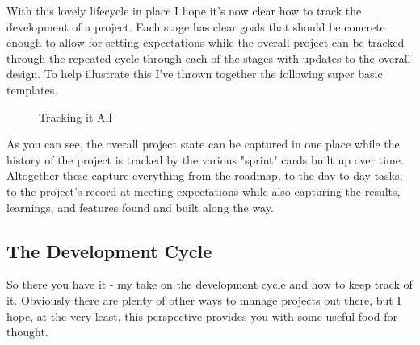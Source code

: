 \documentclass[10pt,a5paper]{book}
\begin{document}
With this lovely lifecycle in place I hope it's now clear how to track the development of a project. Each stage has clear goals that should be concrete enough to allow for setting expectations while the overall project can be tracked through the repeated cycle through each of the stages with updates to the overall design. To help illustrate this I've thrown together the following super basic templates.

\begin{figure}[!htb]
\caption{\label{fig:my-label} Tracking it All}
\end{figure}

As you can see, the overall project state can be captured in one place while the history of the project is tracked by the various "sprint" cards built up over time. Altogether these capture everything from the roadmap, to the day to day tasks, to the project's record at meeting expectations while also capturing the results, learnings, and features found and built along the way. 

\subsection{The Development Cycle}
So there you have it - my take on the development cycle and how to keep track of it. Obviously there are plenty of other ways to manage projects out there, but I hope, at the very least, this perspective provides you with some useful food for thought. 
\end{document}

